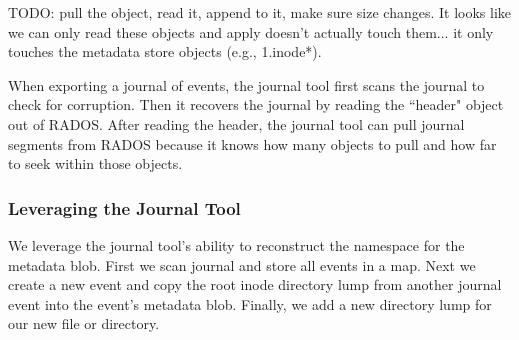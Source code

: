 \documentclass[preprint]{sigplanconf-eurosys}
\begin{document}
TODO: pull the object, read it, append to it, make sure size changes. It looks
like we can only read these objects and apply doesn't actually touch them... it
only touches the metadata store objects (e.g., 1.inode*).



When exporting a journal of events, the journal tool first scans the journal to
check for corruption. Then it recovers the journal by reading the ``header"
object out of RADOS.  After reading the header, the journal tool can pull
journal segments from RADOS because it knows how many objects to pull and how
far to seek within those objects.



%

\subsubsection{Leveraging the Journal Tool}

We leverage the journal tool's ability to reconstruct the namespace for the
metadata blob. First we scan journal and store all events in a map. Next we
create a new event and copy the root inode directory lump from another journal
event into the event's metadata blob. Finally, we add a new directory lump for
our new file or directory.
\end{document}
